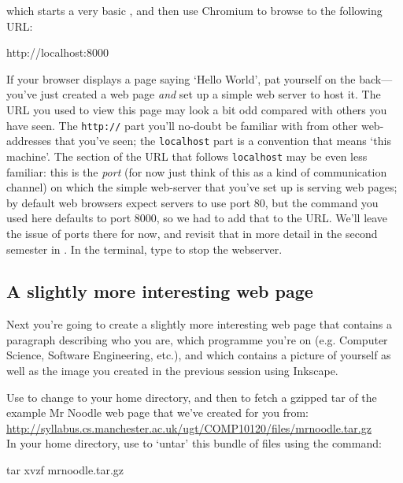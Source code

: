 which starts a very basic , and then use Chromium to browse to the following URL:

\begin{ttoutenv}
http://localhost:8000
\end{ttoutenv}

If your browser displays a page saying `Hello World', pat yourself on
the back---you've just created a web page \textit{and} set up a simple
web server to host it. The URL you used to view this page may look a
bit odd compared with others you have seen. The \texttt{http://} part
you'll no-doubt be familiar with from other web-addresses that you've
seen; the \texttt{localhost} part is a convention that means `this
machine'. The section of the URL that follows \texttt{localhost} may
be even less familiar: this is the \textit{port} (for now just think
of this as a kind of communication channel) on which the simple
web-server that you've set up is serving web pages; by default web
browsers expect servers to use port 80, but the  command you used here defaults to port 8000, so we
had to add that to the URL. We'll leave the issue of ports there for
now, and revisit that in more detail in the second semester in
. In the terminal, type  to stop the webserver.

\subsection{A slightly more interesting web page}

Next you're going to create a slightly more interesting web page that
contains a paragraph describing who you are, which programme you're on
(e.g. Computer Science, Software Engineering, etc.), and which
contains a picture of yourself as well as the image you created in the
previous session using Inkscape.

Use  to change to your home directory, and then  to fetch a gzipped tar of the example Mr Noodle web page that we've created for you from:
\\

{\small
\url{http://syllabus.cs.manchester.ac.uk/ugt/COMP10120/files/mrnoodle.tar.gz}
}
\\

In your home directory, use  to `untar' this bundle of files using the command:

\begin{ttoutenv}
tar xvzf mrnoodle.tar.gz
\end{ttoutenv}

